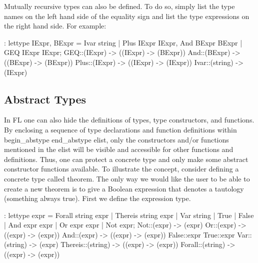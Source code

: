 Mutually recursive types can also be defined. To do so, simply list
the type names on the left
hand side of the equality sign and list the type expressions on the
right hand side. For example:
\begin{hol}
: lettype IExpr, BExpr = Ivar string | Plus IExpr IExpr,
                         And BExpr BExpr | GEQ IExpr IExpr;
GEQ::(IExpr) -> ((IExpr) -> (BExpr))
And::(BExpr) -> ((BExpr) -> (BExpr))
Plus::(IExpr) -> ((IExpr) -> (IExpr))
Ivar::(string) -> (IExpr)
\end{hol}

\subsection{Abstract Types}

In FL one can also hide the definitions of types, type constructors,
and functions. By
enclosing a sequence of type declarations and function definitions
within begin\_abstype
end\_abstype elist, only the constructors and/or functions mentioned
in the elist will be visible
and accessible for other functions and definitions. Thus, one can protect
a concrete type and only
make some abstract constructor functions available. To illustrate the
concept, consider defining a
concrete type called theorem. The only way we would like the user to
be able to create a new theorem is to give a Boolean expression that
denotes a tautology (something always true).
First we define the expression type.
\begin{hol}
: lettype expr =  Forall string expr |
                Thereis string expr |
                Var string |
                True |
                False |
                And expr expr |
                Or expr expr |
                Not expr;
Not::(expr) -> (expr)
Or::(expr) -> ((expr) -> (expr))
And::(expr) -> ((expr) -> (expr))
False::expr
True::expr
Var::(string) -> (expr)
Thereis::(string) -> ((expr) -> (expr))
Forall::(string) -> ((expr) -> (expr))
\end{hol}

